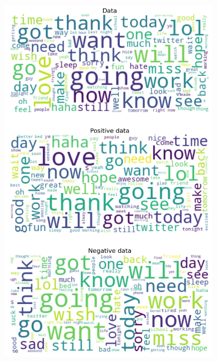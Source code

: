 \documentclass{article}
\begin{document}
\begin{itemize}
\begin{figure}[H]
\begin{subfigure}[b]{0.24\textwidth}
\includegraphics[width=\textwidth]{chapter-06/section-01-01/03/visualization/2/wordcloud.png}
\end{subfigure}
\begin{subfigure}[b]{0.24\textwidth}
\centering

\end{subfigure}
\end{figure}
\end{itemize}
\end{document}
